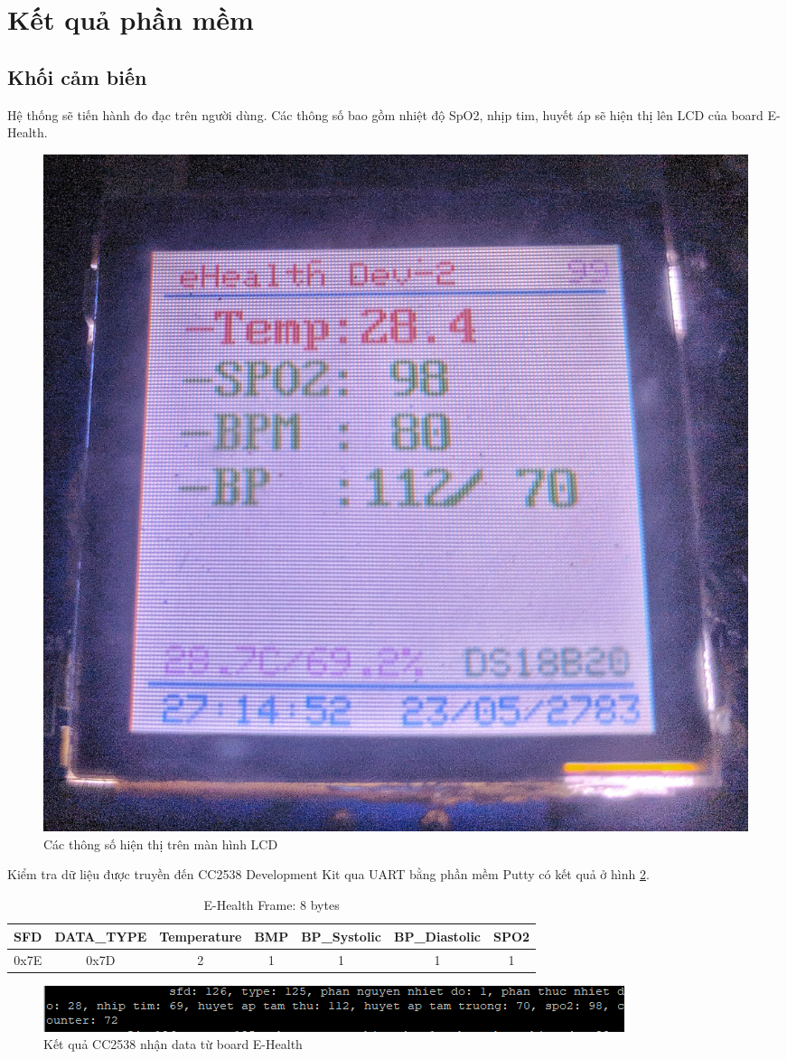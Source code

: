 \documentclass{report}
\begin{document}
\section{Kết quả phần mềm}
\subsection{Khối cảm biến}
Hệ thống sẽ tiến hành đo đạc trên người dùng. Các thông số bao gồm nhiệt độ SpO2, nhịp tim, huyết áp sẽ hiện thị lên LCD của board E-Health.
\begin{figure}[h]
	\centering
	\includegraphics[scale = 0.05]{fig68.png}
	\caption{Các thông số hiện thị trên màn hình LCD}
	\label{fig:Graph68}
\end{figure}

Kiểm tra dữ liệu được truyền đến CC2538 Development Kit qua UART bằng phần mềm Putty có kết quả ở hình \ref{fig:Graph66}.
\begin{table}[h]
	\centering
	\begin{tabular}{|c|c|c|c|c|c|c|}
		\hline
		SFD  & DATA\_TYPE & Temperature & BMP & BP\_Systolic & BP\_Diastolic & SPO2 \\ \hline
		0x7E & 0x7D       & 2           & 1   & 1            & 1             & 1    \\ \hline
	\end{tabular}
	\caption{E-Health Frame: 8 bytes}
\end{table}
\begin{figure}[h]
	\centering
	\includegraphics[scale = 0.8]{fig66.png}
	\caption{Kết quả CC2538 nhận data từ board E-Health}
	\label{fig:Graph66}
\end{figure}
\end{document}
